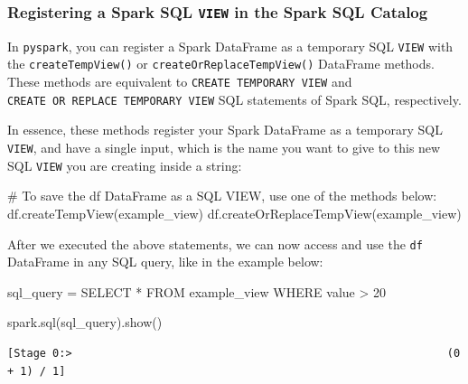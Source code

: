\documentclass[
  11pt,
  letterpaper,
  DIV=11,
  numbers=noendperiod]{scrreprt}
\newenvironment{Shaded}{\begin{snugshade}}{\end{snugshade}}
\newcommand{\CommentTok}[1]{\textcolor[rgb]{0.37,0.37,0.37}{#1}}
\newcommand{\NormalTok}[1]{\textcolor[rgb]{0.00,0.23,0.31}{#1}}
\newcommand{\OperatorTok}[1]{\textcolor[rgb]{0.37,0.37,0.37}{#1}}
\newcommand{\StringTok}[1]{\textcolor[rgb]{0.13,0.47,0.30}{#1}}
\begin{document}
\hypertarget{registering-a-spark-sql-view-in-the-spark-sql-catalog}{%
\subsubsection{\texorpdfstring{Registering a Spark SQL \texttt{VIEW} in
the Spark SQL
Catalog}{Registering a Spark SQL VIEW in the Spark SQL Catalog}}\label{registering-a-spark-sql-view-in-the-spark-sql-catalog}}

In \texttt{pyspark}, you can register a Spark DataFrame as a temporary
SQL \texttt{VIEW} with the \texttt{createTempView()} or
\texttt{createOrReplaceTempView()} DataFrame methods. These methods are
equivalent to \texttt{CREATE\ TEMPORARY\ VIEW} and
\texttt{CREATE\ OR\ REPLACE\ TEMPORARY\ VIEW} SQL statements of Spark
SQL, respectively.

In essence, these methods register your Spark DataFrame as a temporary
SQL \texttt{VIEW}, and have a single input, which is the name you want
to give to this new SQL \texttt{VIEW} you are creating inside a string:

\begin{Shaded}
\begin{Highlighting}[]
\CommentTok{\# To save the \textasciigrave{}df\textasciigrave{} DataFrame as a SQL VIEW, use one of the methods below:}
\NormalTok{df.createTempView(}\StringTok{\textquotesingle{}example\_view\textquotesingle{}}\NormalTok{)}
\NormalTok{df.createOrReplaceTempView(}\StringTok{\textquotesingle{}example\_view\textquotesingle{}}\NormalTok{)}
\end{Highlighting}
\end{Shaded}

After we executed the above statements, we can now access and use the
\texttt{df} DataFrame in any SQL query, like in the example below:

\begin{Shaded}
\begin{Highlighting}[]
\NormalTok{sql\_query }\OperatorTok{=} \StringTok{\textquotesingle{}\textquotesingle{}\textquotesingle{}}
\StringTok{SELECT *}
\StringTok{FROM example\_view}
\StringTok{WHERE value \textgreater{} 20}
\StringTok{\textquotesingle{}\textquotesingle{}\textquotesingle{}}

\NormalTok{spark.sql(sql\_query).show()}
\end{Highlighting}
\end{Shaded}

\begin{verbatim}
[Stage 0:>                                                          (0 + 1) / 1]                                                                                
\end{verbatim}
\end{document}
